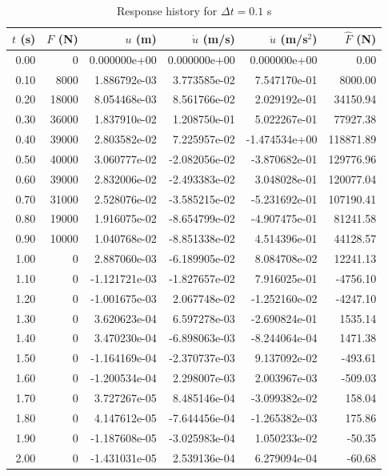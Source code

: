 \begin{table}[H]
\centering
\scriptsize
\caption{Response history for $\Delta t = 0.1$ s}
\begin{tabular}{rrrrrr}
\hline
$t$ (s) & $F$ (N) & $u$ (m) & $\dot{u}$ (m/s) & $\ddot{u}$ (m/s$^2$) & $\hat{F}$ (N) \\
\hline
0.00 & 0 & 0.000000e+00 & 0.000000e+00 & 0.000000e+00 & 0.00 \\
0.10 & 8000 & 1.886792e-03 & 3.773585e-02 & 7.547170e-01 & 8000.00 \\
0.20 & 18000 & 8.054468e-03 & 8.561766e-02 & 2.029192e-01 & 34150.94 \\
0.30 & 36000 & 1.837910e-02 & 1.208750e-01 & 5.022267e-01 & 77927.38 \\
0.40 & 39000 & 2.803582e-02 & 7.225957e-02 & -1.474534e+00 & 118871.89 \\
0.50 & 40000 & 3.060777e-02 & -2.082056e-02 & -3.870682e-01 & 129776.96 \\
0.60 & 39000 & 2.832006e-02 & -2.493383e-02 & 3.048028e-01 & 120077.04 \\
0.70 & 31000 & 2.528076e-02 & -3.585215e-02 & -5.231692e-01 & 107190.41 \\
0.80 & 19000 & 1.916075e-02 & -8.654799e-02 & -4.907475e-01 & 81241.58 \\
0.90 & 10000 & 1.040768e-02 & -8.851338e-02 & 4.514396e-01 & 44128.57 \\
1.00 & 0 & 2.887060e-03 & -6.189905e-02 & 8.084708e-02 & 12241.13 \\
1.10 & 0 & -1.121721e-03 & -1.827657e-02 & 7.916025e-01 & -4756.10 \\
1.20 & 0 & -1.001675e-03 & 2.067748e-02 & -1.252160e-02 & -4247.10 \\
1.30 & 0 & 3.620623e-04 & 6.597278e-03 & -2.690824e-01 & 1535.14 \\
1.40 & 0 & 3.470230e-04 & -6.898063e-03 & -8.244064e-04 & 1471.38 \\
1.50 & 0 & -1.164169e-04 & -2.370737e-03 & 9.137092e-02 & -493.61 \\
1.60 & 0 & -1.200534e-04 & 2.298007e-03 & 2.003967e-03 & -509.03 \\
1.70 & 0 & 3.727267e-05 & 8.485146e-04 & -3.099382e-02 & 158.04 \\
1.80 & 0 & 4.147612e-05 & -7.644456e-04 & -1.265382e-03 & 175.86 \\
1.90 & 0 & -1.187608e-05 & -3.025983e-04 & 1.050233e-02 & -50.35 \\
2.00 & 0 & -1.431031e-05 & 2.539136e-04 & 6.279094e-04 & -60.68 \\
\hline
\end{tabular}
\end{table}
\FloatBarrier

